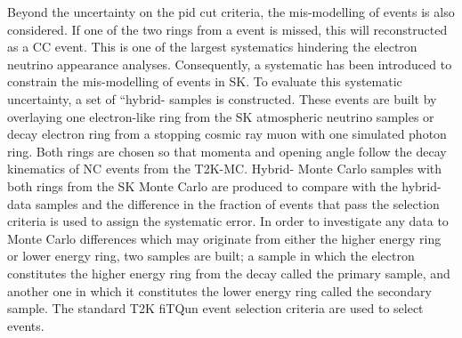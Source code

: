 \begin{table}[ht!]
  \caption{Reconstructed event topology categories on which the SK detector systematics \cite{t2k_tn_318} are based.}
  \label{tab:SelsAndSysts_Systs_Topologies}
\end{table}

Beyond the uncertainty on the pid cut criteria, the mis-modelling of  events is also considered. If one of the two rings from a  event is missed, this will reconstructed as a CC event. This is one of the largest systematics hindering the electron neutrino appearance analyses. Consequently, a systematic has been introduced to constrain the mis-modelling of  events in SK. To evaluate this systematic uncertainty, a set of “hybrid- samples is constructed. These events are built by overlaying one electron-like ring from the SK atmospheric neutrino samples or decay electron ring from a stopping cosmic ray muon with one simulated photon ring. Both rings are chosen so that momenta and opening angle follow the decay kinematics of NC  events from the T2K-MC. Hybrid- Monte Carlo samples with both rings from the SK Monte Carlo are produced to compare with the hybrid- data samples and the difference in the fraction of events that pass the  selection criteria is used to assign the systematic error. In order to investigate any data to Monte Carlo differences which may originate from either the higher energy ring or lower energy ring, two samples are built; a sample in which the electron constitutes the higher energy ring from the  decay called the primary sample, and another one in which it constitutes the lower energy ring called the secondary sample. The standard T2K  fiTQun event selection criteria are used to select events.

